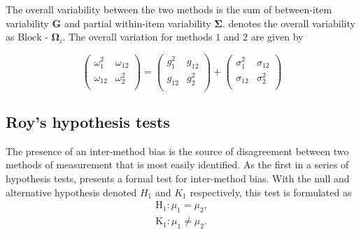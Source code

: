\documentclass[Chap4main.tex]{subfiles}
\begin{document}
The overall variability between the two methods is the sum of between-item variability
$\boldsymbol{G}$ and partial within-item variability $\boldsymbol{\Sigma}$. \citet{roy} denotes the overall variability as ${\mbox{Block - }\boldsymbol \Omega_{i}}$. The overall variation for methods $1$ and $2$ are given by

\begin{equation}
\left(\begin{array}{cc}
              \omega^2_1  & \omega_{12} \\
              \omega_{12} & \omega^2_2 \\
       \end{array}  \right)
 =
\left(\begin{array}{cc}
              g^2_1  & g_{12} \\
              g_{12} & g^2_2 \\
\end{array} \right)
+
\left( \begin{array}{cc}
              \sigma^2_1  & \sigma_{12} \\
              \sigma_{12} & \sigma^2_2 \\
\end{array}\right)
\end{equation}
\newpage
\subsection{Roy's hypothesis tests}
The presence of an inter-method bias is the source of disagreement between two methods of measurement that is most easily identified. As the first in a series of hypothesis tests, \citet{roy} presents a formal test for inter-method bias. With the null and alternative hypothesis denoted $H_1$ and $K_1$ respectively, this test is formulated as
\begin{eqnarray*}
\operatorname{H_1} : \mu_1 = \mu_2 ,\\
\operatorname{K_1} : \mu_1 \neq \mu_2.
\end{eqnarray*}
\end{document}
